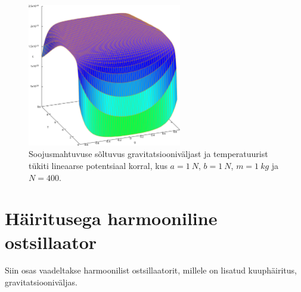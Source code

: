 \documentclass{trkut}%
\begin{document}
\begin{figure}[htb!]
    \includegraphics[width=0.6\textwidth]{maxima/m1a1b1T0_10S400.pdf}
    \caption{Soojusmahtuvuse sõltuvus gravitatsiooniväljast ja temperatuurist tükiti lineaarse potentsiaal korral, kus $a=\SI{1}{N}$, $b=\SI{1}{N}$, $m=\SI{1}{kg}$ ja $N=400$.}
    \label{joon4}
\end{figure}




%

\section{Häiritusega harmooniline ostsillaator}

Siin osas vaadeltakse harmoonilist ostsillaatorit, millele on lisatud kuuphäiritus, gravitatsiooniväljas.
\end{document}
